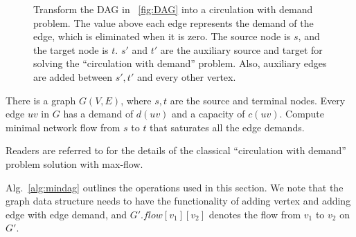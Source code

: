 \begin{figure*}[h!]
    \caption{Transform the DAG in ~\ref{fig:DAG} into a circulation with demand problem. 
    The value above each edge represents the demand of the edge, which is eliminated when it is zero.
    The source node is $s$, and the target node is $t$. $s'$ and $t'$ are the auxiliary source and target for solving the ``circulation with demand'' problem.
    Also, auxiliary edges are added between $s', t'$ and every other vertex.}
    \label{fig:sc-flow}
\end{figure*}


\begin{problem}
There is a graph $G(V,E)$, where $s,t$ are the source and terminal nodes. 
Every edge $uv$ in $G$ has a demand of $d(uv)$ and a capacity of $c(uv)$. 
Compute minimal network flow from $s$ to $t$ that saturates all the edge 
demands.
\end{problem}

Readers are referred to \cite{kleinberg2006algorithm} for %
the details of the classical ``circulation with demand'' problem solution with max-flow. 

Alg.~\ref{alg:mindag} outlines the operations
used in this section. We note that the 
graph data structure needs to have the functionality of adding vertex and adding 
edge with edge demand, and $G'.flow[v_1][v_2]$ denotes the flow from $v_1$ to $v_2$ on $G'$.

